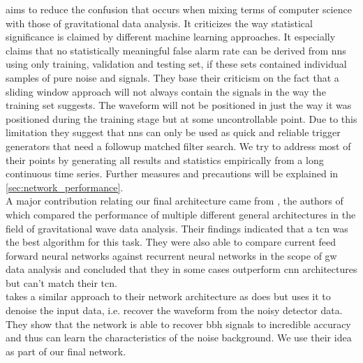 \cite{cnn_magiacal_bullet} aims to reduce the confusion that occurs when mixing terms of computer science with those of gravitational data analysis. It criticizes the way statistical significance is claimed by different machine learning approaches. It especially claims that no statistically meaningful false alarm rate can be derived from \gls{nn}s using only training, validation and testing set, if these sets contained individual samples of pure noise and signals. They base their criticism on the fact that a sliding window approach will not always contain the signals in the way the training set suggests. The waveform will not be positioned in just the way it was positioned during the training stage but at some uncontrollable point. Due to this limitation they suggest that \gls{nn}s can only be used as quick and reliable trigger generators that need a followup matched filter search. We try to address most of their points by generating all results and statistics empirically from a long continuous time series. Further measures and precautions will be explained in \autoref{sec:network_performance}.\\
A major contribution relating our final architecture came from \cite{tcn_idea}, the authors of which compared the performance of multiple different general architectures in the field of gravitational wave data analysis. Their findings indicated that a \gls{tcn} was the best algorithm for this task. They were also able to compare current feed forward neural networks against recurrent neural networks in the scope of \gls{gw} data analysis and concluded that they in some cases outperform \gls{cnn} architectures but can't match their \gls{tcn}.\\
\cite{dnn_denoising} takes a similar approach to their network architecture as \cite{tcn_idea} does but uses it to denoise the input data, i.e. recover the waveform from the noisy detector data. They show that the network is able to recover \gls{bbh} signals to incredible accuracy and thus can learn the characteristics of the noise background. We use their idea as part of our final network.
\newpage
$\ $
\newpage